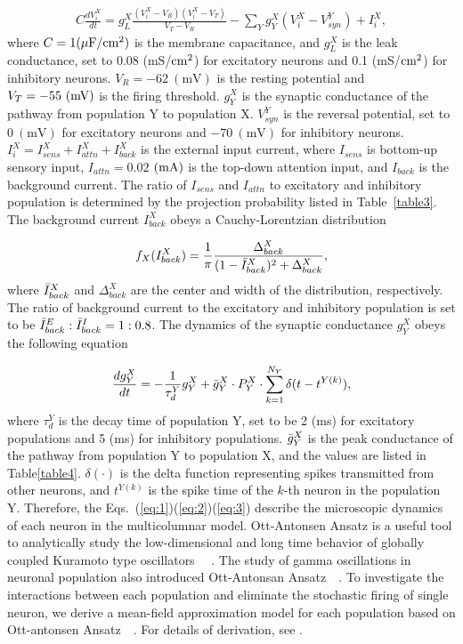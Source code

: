 \documentclass[10pt,letterpaper]{article}
\begin{document}
\begin{eqnarray}
\label{eq:1}
    C\frac{dV_{i}^{X}}{dt} = g_{L}^{X}\frac{(V_{i}^{X}-V_{R})(V_{i}^{X}-V_{T})}{V_{T}-V_{R}}-\sum_{Y}g_{Y}^{X}(V_{i}^{X}-V_{syn}^{Y}) + I_{i}^{X},
\end{eqnarray}
where $C=1(\rm \mu F/cm^2)$ is the membrane capacitance, and $g_{L}^{X}$ is the leak conductance, set to 0.08 (mS/$\rm cm^{2}$) for excitatory neurons and 0.1 (mS/$\rm cm^{2}$) for inhibitory neurons. $V_{R}=-62\ \mathrm{(mV)}$ is the resting potential and $V_{T}=-55\ (\rm mV)$ is the firing threshold. $g_{Y}^{X}$ is the synaptic conductance of the pathway from population Y to population X. $V_{syn}^{Y}$ is the reversal potential, set to  $0\ \mathrm{(mV)}$ for excitatory neurons and $-70\ \mathrm{(mV)}$ for inhibitory neurons. $I_{i}^{X}=I_{sens}^{X} + I_{attn}^{X} + I_{back}^{X}$ is the external input current, where $I_{sens}$ is bottom-up sensory input, $I_{attn}=0.02$ $(\rm mA)$ is the top-down attention input, and $I_{back}$ is the background current. The ratio of $I_{sens}$ and $I_{attn}$ to excitatory and inhibitory population is determined by the projection probability listed in Table~\ref{table3}. The background current $I_{back}^{X}$ obeys a Cauchy-Lorentzian distribution

\begin{eqnarray}
\label{eq:2}
        f_{X}(I_{back}^{X}) = \frac{1}{\pi}\frac{\Delta_{back}^{X}}{(1-\Bar{I}_{back}^{X})^{2}+\Delta_{back}^{X}},
\end{eqnarray}
where $\Bar{I}_{back}^{X}$ and $\Delta_{back}^{X}$ are the center and width of the distribution, respectively. The ratio of background current to the excitatory and inhibitory population is set to be $\Bar{I}_{back}^{E} : \Bar{I}_{back}^{I} = 1:0.8$. The dynamics of the synaptic conductance $g_{Y}^{X}$ obeys the following equation

\begin{eqnarray}
\label{eq:3}
    \frac{dg_{Y}^{X}}{dt} = -\frac{1}{\tau_{d}^{Y}}g_{Y}^{X}+\Bar{g}_{Y}^{X}\cdot P_{Y}^{X}\cdot\sum_{k=1}^{N_{Y}}\delta(t-t^{Y(k)}),
\end{eqnarray}
where $\tau_{d}^{Y}$ is the decay time of population Y, set to be 2 (ms) for excitatory populations and 5 (ms) for inhibitory populations. $\Bar{g}_{Y}^{X}$ is the peak conductance of the pathway from population Y to population X, and the values are listed in Table\ref{table4}. $\delta(\cdot)$ is the delta function representing spikes transmitted from other neurons, and $t^{Y(k)}$ is the spike time of the $k$-th neuron in the population Y. Therefore, the Eqs.~(\ref{eq:1})(\ref{eq:2})(\ref{eq:3}) describe the microscopic dynamics of each neuron in the multicolumnar model. Ott-Antonsen Ansatz is a useful tool to analytically study the low-dimensional and long time behavior of globally coupled Kuramoto type oscillators ~\cite{ott2008}~\cite{ott2009}. The study of gamma oscillations in neuronal population also introduced Ott-Antonsan Ansatz~\cite{akao2019}~\cite{zheng2021}. To investigate the interactions between each population and eliminate the stochastic firing of single neuron, we derive a mean-field approximation model for each population based on Ott-antonsen Ansatz~\cite{ott2008}~\cite{montbrio2015}. For details of derivation, see .
\end{document}
